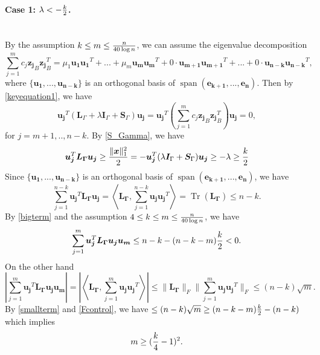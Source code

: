 \documentclass[11pt]{article}
\newcommand{\<}{\langle}
\renewcommand{\>}{\rangle}
\newcommand{\vct}[1]{\bm{#1}}
\newcommand{\mtx}[1]{\bm{#1}}
\newcommand{\Span}{\operatorname{span}}
\newcommand{\tr}{\operatorname{Tr}}
\numberwithin{equation}{section}
\begin{document}
 \paragraph{Case 1: $\lambda<-{k\over2}$.}~~ \\
By the assumption $k\leq m \leq {n \over {40\log n}}$, we can assume the eigenvalue decomposition
\[
\sum_{j=1}^{m}c_j {\vct{z_j }}_B{\vct{z_j}}_B^T =\mu_1\vct{u_1}\vct{u_1}^T+...+\mu_m\vct{u_m}\vct{u_m}^T+0\cdot\vct{u_
{m+1}}\vct{u_{m+1}}^T+...+0\cdot \vct{u_{n-k}}\vct{u_{n-k}}^T,
\]
where $\{\vct{u_1}, ..., \vct{u_{n-k}}\}$ is an orthogonal basis of $\Span(\vct{e_{k+1}}, ..., \vct{e_{n}})$.
Then by \eqref{keyequation1}, we have
\[
\vct{u_j}^T(\mtx{L}_{\Gamma} + \lambda \mtx{I}_\Gamma + \mtx{S}_\Gamma)\vct{u_j}=\vct{u_j}^T\left(\sum_{j=1}^{m}c_j {\vct{z_j }}_B{\vct{z_j}}_B^T \right)\vct{u_j}=0,
\]
for $j=m+1,.., n-k$. By \eqref{S_Gamma}, we have
\begin{equation}
\label{bigterm}
\vct{u_j}^T\mtx{L_{\Gamma}}\vct{u_j}\geq {{\|\vct{x}\|_1^2}\over2}=-\vct{u_j}^T(\lambda \mtx{I}_\Gamma + \mtx{S}_\Gamma)\vct{u_j}\geq -\lambda\geq {k \over 2} 
\end{equation}
Since $\{\vct{u_1}, ..., \vct{u_{n-k}}\}$ is an orthogonal basis of $\Span(\vct{e_{k+1}}, ..., \vct{e_{n}})$, we have
\[
\sum_{j=1}^{n-k}\vct{u_j}^T\mtx{L_{\Gamma}}\vct{u_j}=\left\langle \mtx{L_\Gamma}, \sum_{j=1}^{n-k}\vct{u_j}\vct{u_j}^T\right\rangle=\tr(\mtx{L_\Gamma})\leq n-k.
\]
By \eqref{bigterm} and the assumption $4\leq k\leq m \leq {n \over {40\log n}}$, we have 
\begin{equation}
\label{smallterm}
\sum_{j=1}^{m}\vct{u_j}^T\mtx{L_{\Gamma}}\vct{u_j}\vct{u_m}\leq n-k-(n-k-m){k \over2}<0.
\end{equation}
On the other hand
\begin{equation}
\label{Fcontrol}
\left|\sum_{j=1}^{m}\vct{u_j}^T\mtx{L_{\Gamma}}\vct{u_j}\vct{u_m}\right|=\left|\left\langle \mtx{L_\Gamma}, \sum_{j=1}^{m}\vct{u_j}\vct{u_j}^T\right\rangle\right|\leq \|\mtx{L_\Gamma}\|_F\|\sum_{j=1}^{m}\vct{u_j}\vct{u_j}^T\|_F\leq (n-k)\sqrt{m}.
\end{equation}
By \eqref{smallterm} and \eqref{Fcontrol}, we have $\leq (n-k)\sqrt{m}\geq (n-k-m){k \over2}-(n-k)$ which implies
\[
m\geq ({k\over 4}-1)^2.
\]
\end{document}
